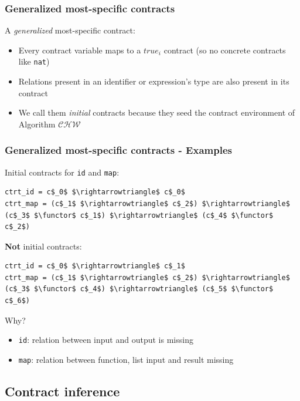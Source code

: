 \documentclass[]{beamer}
\makeatletter
\newcommand{\functor}{<\!\!\!@\!\!\!>}
\newcommand{\CHW}{$\mathcal{CHW}$}
\makeatother
\begin{document}
\begin{frame}
\frametitle{Generalized most-specific contracts}

A \emph{generalized} most-specific contract:

\begin{itemize}
	\item Every contract variable maps to a $true_i$ contract (so no concrete contracts like \texttt{nat})
	\item Relations present in an identifier or expression's type are also present in its contract
	\item We call them \emph{initial} contracts because they seed the contract environment of Algorithm \CHW
\end{itemize}

\end{frame}

\begin{frame}[fragile]
\frametitle{Generalized most-specific contracts - Examples}

Initial contracts for \texttt{id} and \texttt{map}:

\begin{lstlisting}[mathescape]
ctrt_id = c$_0$ $\rightarrowtriangle$ c$_0$
ctrt_map = (c$_1$ $\rightarrowtriangle$ c$_2$) $\rightarrowtriangle$ (c$_3$ $\functor$ c$_1$) $\rightarrowtriangle$ (c$_4$ $\functor$ c$_2$)
\end{lstlisting}

\textbf{Not} initial contracts:

\begin{lstlisting}[mathescape]
ctrt_id = c$_0$ $\rightarrowtriangle$ c$_1$
ctrt_map = (c$_1$ $\rightarrowtriangle$ c$_2$) $\rightarrowtriangle$ (c$_3$ $\functor$ c$_4$) $\rightarrowtriangle$ (c$_5$ $\functor$ c$_6$)
\end{lstlisting}

Why?
\begin{itemize}
	\item \texttt{id}: relation between input and output is missing
	\item \texttt{map}: relation between function, list input and result missing
\end{itemize}

\end{frame}

\subsection{Contract inference}
\end{document}
